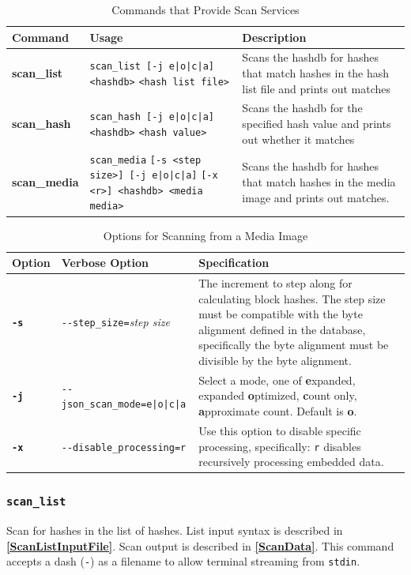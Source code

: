 \documentclass[11pt,fleqn]{article} %
\begin{document}
\begin{table}[!ht]
\centering
\caption{Commands that Provide Scan Services}
\label{tab:scanServices}
\begin{tabular}{|p{3.5 cm}|p{6 cm}|p{4 cm}|}
\hline \hline
\textbf{Command} & \textbf{Usage} & \textbf{Description} \\
\hline
\textbf{scan\_list} & \verb+scan_list [-j e|o|c|a] <hashdb>+ \verb+<hash list file>+ & Scans the hashdb for hashes that match hashes in the hash list file and prints out matches\\
\hline
\textbf{scan\_hash} & \verb+scan_hash [-j e|o|c|a] <hashdb>+ \verb+<hash value>+ & Scans the hashdb for the specified hash value and prints out whether it matches\\
\hline
\textbf{scan\_media} & \verb+scan_media+ \verb+[-s <step size>] [-j e|o|c|a]+ \verb+[-x <r>] <hashdb> <media media>+ & Scans the hashdb for hashes that match hashes in the media image and prints out matches.\\
\hline
\end{tabular}
\end{table}

\begin{table}[!ht]
\centering
\caption{Options for Scanning from a Media Image}
\label{tab:ScanOptions}
\begin{tabular}{|p{1.5 cm}|p{8 cm}|p{4 cm}|}
\hline \hline
\textbf{Option} & \textbf{Verbose Option} & \textbf{Specification} \\
\hline
\textbf{\texttt{-s}} & \verb+--step_size=+\textit{step size} & The increment to step along for calculating block hashes. The step size must be compatible with the byte alignment defined in the database, specifically the byte alignment must be divisible by the byte alignment.\\
\hline
\textbf{\texttt{-j}} & \verb+--json_scan_mode=e|o|c|a+ & Select a mode, one of \textbf{e}xpanded, expanded \textbf{o}ptimized, \textbf{c}ount only, \textbf{a}pproximate count. Default is \textbf{o}.\\
\hline
\textbf{\texttt{-x}} & \verb+--disable_processing=r+ & Use this option to disable specific processing, specifically: \verb+r+ disables recursively processing embedded data.\\
\hline
\end{tabular}
\end{table}

\subsubsection{\texttt{scan\_list}}
Scan for hashes in the list of hashes. List input syntax is described in \textbf{\autoref{ScanListInputFile}}. Scan output is described in \textbf{\autoref{ScanData}}. This command accepts a dash (\verb+-+) as a filename to allow terminal streaming from \verb+stdin+.\\
\end{document}
